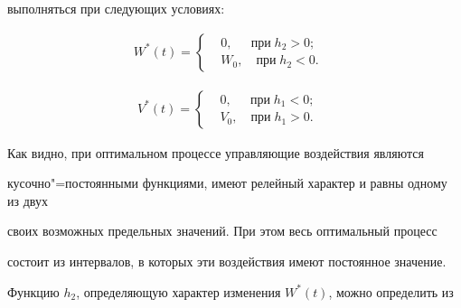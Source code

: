 выполняться при следующих условиях:



\begin{equation}

\label{f4}

   \begin{aligned}

W^*(t)=\left \{ \begin{aligned} &

0, \quad \; \, \text{при} \; h_2 > 0; \\

& W_0, \quad \text{при} \; h_2 < 0.

\end{aligned}

\right. \quad

   \end{aligned}

\end{equation}



\begin{equation}

\label{f5}

   \begin{aligned}

V^*(t)=\left \{ \begin{aligned} &

0, \quad \; \, \text{при} \; h_1 < 0; \\

& V_0, \quad \text{при} \; h_1 > 0.

\end{aligned}

\right. \quad

   \end{aligned}

\end{equation}



Как видно, при оптимальном процессе управляющие воздействия являются

кусочно"=постоянными функциями, имеют релейный характер и равны одному из двух

своих возможных предельных значений. При этом весь оптимальный процесс

состоит из интервалов, в которых эти воздействия имеют постоянное значение.



Функцию $h_2$, определяющую характер изменения $W^*(t)$, можно определить из

